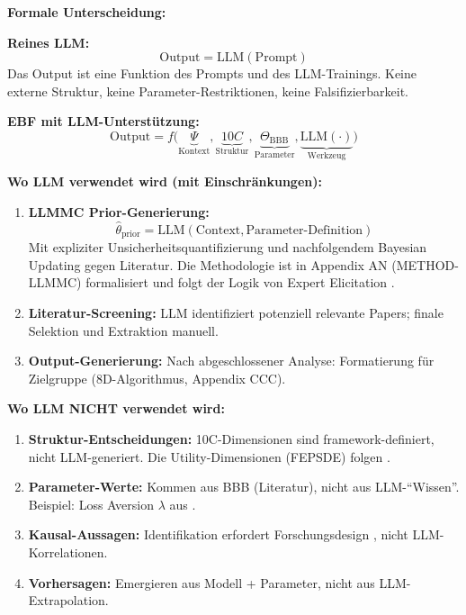 \begin{tcolorbox}[colback=green!5!white, colframe=green!75!black,
    title=P1-$\mathcal{W}$-L: Lang (Wissenschaft)]

\textbf{Formale Unterscheidung:}

\textbf{Reines LLM:}
\begin{equation}
\text{Output} = \text{LLM}(\text{Prompt})
\end{equation}
Das Output ist eine Funktion des Prompts und des LLM-Trainings. Keine externe Struktur, keine Parameter-Restriktionen, keine Falsifizierbarkeit.

\textbf{EBF mit LLM-Unterstützung:}
\begin{equation}
\text{Output} = f\Big(\underbrace{\Psi}_{\text{Kontext}}, \underbrace{10C}_{\text{Struktur}}, \underbrace{\Theta_{\text{BBB}}}_{\text{Parameter}}, \underbrace{\text{LLM}(\cdot)}_{\text{Werkzeug}}\Big)
\end{equation}

\textbf{Wo LLM verwendet wird (mit Einschränkungen):}

\begin{enumerate}
    \item \textbf{LLMMC Prior-Generierung:}
    \begin{equation}
    \hat{\theta}_{\text{prior}} = \text{LLM}(\text{Context}, \text{Parameter-Definition})
    \end{equation}
    Mit expliziter Unsicherheitsquantifizierung und nachfolgendem Bayesian Updating gegen Literatur. Die Methodologie ist in Appendix AN (METHOD-LLMMC) formalisiert und folgt der Logik von Expert Elicitation \citep{ohaganelicitation}.

    \item \textbf{Literatur-Screening:}
    LLM identifiziert potenziell relevante Papers; finale Selektion und Extraktion manuell.

    \item \textbf{Output-Generierung:}
    Nach abgeschlossener Analyse: Formatierung für Zielgruppe (8D-Algorithmus, Appendix CCC).
\end{enumerate}

\textbf{Wo LLM NICHT verwendet wird:}

\begin{enumerate}
    \item \textbf{Struktur-Entscheidungen:} 10C-Dimensionen sind framework-definiert, nicht LLM-generiert. Die Utility-Dimensionen (FEPSDE) folgen \citet{PAP-gaechter2002altruistic}.
    \item \textbf{Parameter-Werte:} Kommen aus BBB (Literatur), nicht aus LLM-``Wissen''. Beispiel: Loss Aversion $\lambda$ aus \citet{PAP-PAP-kahneman1979prospectprospect}.
    \item \textbf{Kausal-Aussagen:} Identifikation erfordert Forschungsdesign \citep{PAP-PAP-camerer2003behavioralbehavioral}, nicht LLM-Korrelationen.
    \item \textbf{Vorhersagen:} Emergieren aus Modell + Parameter, nicht aus LLM-Extrapolation.
\end{enumerate}


\end{tcolorbox}
